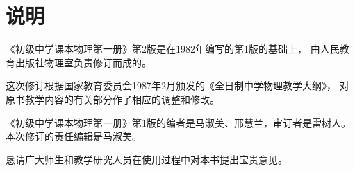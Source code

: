 
\chapter{说明}

《初级中学课本物理第一册》第2版是在1982年编写的第1版的基础上，
由人民教育出版社物理室负责修订而成的。

这次修订根据国家教育委员会1987年2月颁发的《全日制中学物理教学大纲》，
对原书教学内容的有关部分作了相应的调整和修改。

《初级中学课本物理第一册》第1版的编者是马淑美、邢慧兰，审订者是雷树人。
本次修订的责任编辑是马淑美。

恳请广大师生和教学研究人员在使用过程中对本书提出宝贵意见。
